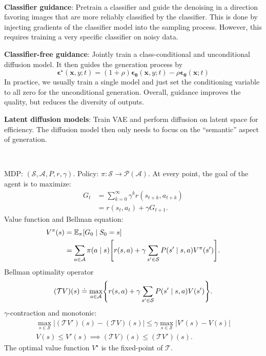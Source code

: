 \documentclass{article}
\newcommand{\lft}{\mathopen{}\mathclose\bgroup\left}
\newcommand{\rgt}{\aftergroup\egroup\right}
\newcommand{\E}{\mathbb{E}}
\renewcommand{\vec}[1]{\bm{#1}}
\newenvironment{topic}[1]
{\textbf{\sffamily \colorbox{black}{\rlap{\textbf{\textcolor{white}{#1}}}\hspace{\linewidth}\hspace{-2\fboxsep}}} \\ \vspace{0.2cm}}
{}
\begin{document}
\begin{multicols*}{2}
\begin{topic}{Diffusion models}
        \textbf{Classifier guidance}: Pretrain a classifier and guide the denoising in a direction
        favoring images that are more reliably classified by the classifier. This is done by
        injecting gradients of the classifier model into the sampling process. However, this requires
        training a very specific classifier on noisy data.

        \textbf{Classifier-free guidance}: Jointly train a class-conditional and unconditional diffusion model. It then guides the generation process by \[
            \vec{\epsilon}^\star(\vec{x}, y; t) = (1 + \rho) \vec{\epsilon}_{\vec{\theta}}(\vec{x}, y; t) - \rho \vec{\epsilon}_{\vec{\theta}}(\vec{x}; t)
        \]
        In practice, we usually train a single model and just set the conditioning variable to all zero for
        the unconditional generation. Overall, guidance improves the quality, but reduces the diversity of
        outputs.

        \textbf{Latent diffusion models}: Train VAE and perform diffusion on latent space for
        efficiency. The diffusion model then only needs to focus on the ``semantic'' aspect of
        generation.

    \end{topic}

    \begin{topic}{Reinforcement learning}

        MDP: $(\mathcal{S}, \mathcal{A}, P, r, \gamma)$. Policy: $\pi: \mathcal{S} \to
            \mathscr{P}(\mathcal{A})$. At every point, the goal of the agent is to maximize:
        \begin{align*}
            G_t & = \sum_{k=0}^{\infty} \gamma^k r(s_{t+k}, a_{t+k}) \\
                & = r(s_t, a_t) + \gamma G_{t+1}.
        \end{align*}
        Value function and Bellman equation:
        \begin{align*}
            V^\pi(s) & = \E_{\pi} [G_0 \mid S_0 = s]                                                                                             \\
                     & = \sum_{a \in \mathcal{A}} \pi(a \mid s) \lft[ r(s,a) + \gamma \sum_{s' \in \mathcal{S}} P(s' \mid s, a) V^\pi(s') \rgt].
        \end{align*}
        Bellman optimality operator \[
            (\mathcal{T} V) (s) \doteq \max_{a \in \mathcal{A}} \lft\{ r(s,a) + \gamma \sum_{s' \in \mathcal{S}} P(s' \mid s, a) V(s') \rgt\}.
        \]
        $\gamma$-contraction and monotonic:
        \begin{gather*}
            \max_{s \in \mathcal{S}} |(\mathcal{T}V')(s) - (\mathcal{T}V)(s)| \leq \gamma \max_{s \in \mathcal{S}} |V'(s) - V(s)| \\
            V(s) \leq V'(s) \implies (\mathcal{T}V)(s) \leq (\mathcal{T}V')(s).
        \end{gather*}
        The optimal value function $V^\star$ is the fixed-point of $\mathcal{T}$.


\end{topic}
\end{multicols*}
\end{document}
